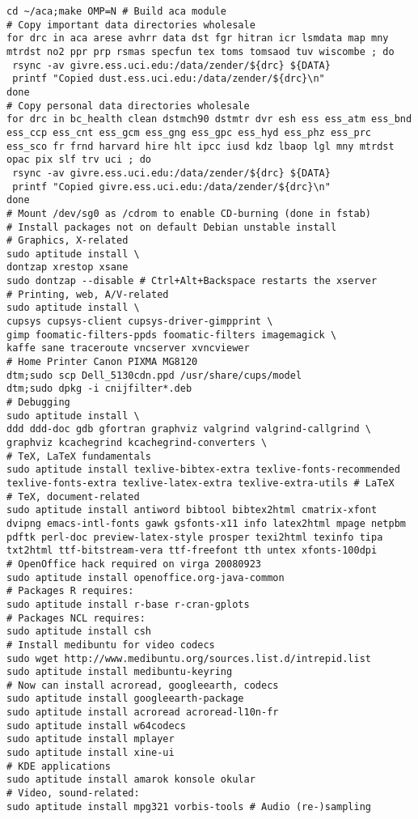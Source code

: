 \documentclass[12pt,twoside]{article}
\begin{document}
\begin{verbatim}
cd ~/aca;make OMP=N # Build aca module
# Copy important data directories wholesale
for drc in aca arese avhrr data dst fgr hitran icr lsmdata map mny mtrdst no2 ppr prp rsmas specfun tex toms tomsaod tuv wiscombe ; do
 rsync -av givre.ess.uci.edu:/data/zender/${drc} ${DATA}
 printf "Copied dust.ess.uci.edu:/data/zender/${drc}\n"
done
# Copy personal data directories wholesale
for drc in bc_health clean dstmch90 dstmtr dvr esh ess ess_atm ess_bnd ess_ccp ess_cnt ess_gcm ess_gng ess_gpc ess_hyd ess_phz ess_prc ess_sco fr frnd harvard hire hlt ipcc iusd kdz lbaop lgl mny mtrdst opac pix slf trv uci ; do
 rsync -av givre.ess.uci.edu:/data/zender/${drc} ${DATA}
 printf "Copied givre.ess.uci.edu:/data/zender/${drc}\n"
done
# Mount /dev/sg0 as /cdrom to enable CD-burning (done in fstab)
# Install packages not on default Debian unstable install 
# Graphics, X-related
sudo aptitude install \
dontzap xrestop xsane
sudo dontzap --disable # Ctrl+Alt+Backspace restarts the xserver
# Printing, web, A/V-related
sudo aptitude install \
cupsys cupsys-client cupsys-driver-gimpprint \
gimp foomatic-filters-ppds foomatic-filters imagemagick \
kaffe sane traceroute vncserver xvncviewer
# Home Printer Canon PIXMA MG8120
dtm;sudo scp Dell_5130cdn.ppd /usr/share/cups/model
dtm;sudo dpkg -i cnijfilter*.deb
# Debugging
sudo aptitude install \
ddd ddd-doc gdb gfortran graphviz valgrind valgrind-callgrind \
graphviz kcachegrind kcachegrind-converters \
# TeX, LaTeX fundamentals
sudo aptitude install texlive-bibtex-extra texlive-fonts-recommended texlive-fonts-extra texlive-latex-extra texlive-extra-utils # LaTeX
# TeX, document-related
sudo aptitude install antiword bibtool bibtex2html cmatrix-xfont dvipng emacs-intl-fonts gawk gsfonts-x11 info latex2html mpage netpbm pdftk perl-doc preview-latex-style prosper texi2html texinfo tipa txt2html ttf-bitstream-vera ttf-freefont tth untex xfonts-100dpi 
# OpenOffice hack required on virga 20080923
sudo aptitude install openoffice.org-java-common
# Packages R requires:
sudo aptitude install r-base r-cran-gplots
# Packages NCL requires:
sudo aptitude install csh
# Install medibuntu for video codecs
sudo wget http://www.medibuntu.org/sources.list.d/intrepid.list
sudo aptitude install medibuntu-keyring
# Now can install acroread, googleearth, codecs
sudo aptitude install googleearth-package
sudo aptitude install acroread acroread-l10n-fr
sudo aptitude install w64codecs
sudo aptitude install mplayer
sudo aptitude install xine-ui
# KDE applications
sudo aptitude install amarok konsole okular
# Video, sound-related: 
sudo aptitude install mpg321 vorbis-tools # Audio (re-)sampling

\end{verbatim}
\end{document}
